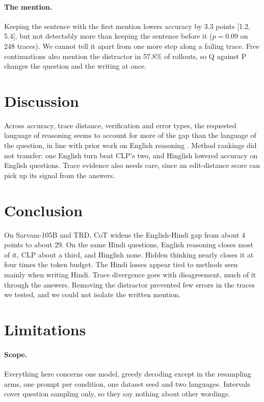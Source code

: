 \documentclass[11pt]{article}
\begin{document}
\paragraph{The mention.}
Keeping the sentence with the first mention lowers accuracy by 3.3 points [1.2, 5.4], but not detectably more than keeping the sentence before it ($p=0.09$ on 248 traces). We cannot tell it apart from one more step along a failing trace. Free continuations also mention the distractor in 57.8\% of rollouts, so Q against P changes the question and the writing at once.

\section{Discussion}
\label{sec:discussion}

Across accuracy, trace distance, verification and error types, the requested language of reasoning seems to account for more of the gap than the language of the question, in line with prior work on English reasoning \citep{shi-etal-2023-mgsm,yong2025crosslingual,qi-etal-2025-models}. Method rankings did not transfer: one English turn beat CLP's two, and Hinglish lowered accuracy on English questions. Trace evidence also needs care, since an edit-distance score can pick up its signal from the answers.

\section{Conclusion}
\label{sec:conclusion}

On Sarvam-105B and TRD, CoT widens the English-Hindi gap from about 4 points to about 29. On the same Hindi questions, English reasoning closes most of it, CLP about a third, and Hinglish none. Hidden thinking nearly closes it at four times the token budget. The Hindi losses appear tied to methods seen mainly when writing Hindi. Trace divergence goes with disagreement, much of it through the answers. Removing the distractor prevented few errors in the traces we tested, and we could not isolate the written mention.

\section*{Limitations}
\label{sec:limitations}

\paragraph{Scope.} Everything here concerns one model, greedy decoding except in the resampling arms, one prompt per condition, one dataset seed and two languages. Intervals cover question sampling only, so they say nothing about other wordings.
\end{document}
